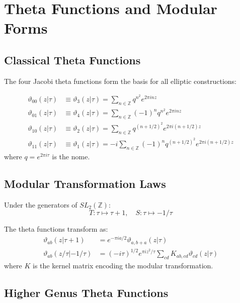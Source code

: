 \appendix
\section{Theta Functions and Modular Forms}

\subsection{Classical Theta Functions}

The four Jacobi theta functions form the basis for all elliptic constructions:

\begin{definition}
\begin{align}
\vartheta_{00}(z|\tau) &\equiv \vartheta_3(z|\tau) = \sum_{n \in \mathbb{Z}} q^{n^2} e^{2\pi inz} \\
\vartheta_{01}(z|\tau) &\equiv \vartheta_4(z|\tau) = \sum_{n \in \mathbb{Z}}(-1)^n q^{n^2} e^{2\pi inz} \\
\vartheta_{10}(z|\tau) &\equiv \vartheta_2(z|\tau) = \sum_{n \in \mathbb{Z}} q^{(n+1/2)^2} e^{2\pi i(n+1/2)z} \\
\vartheta_{11}(z|\tau) &\equiv \vartheta_1(z|\tau) = -i\sum_{n \in \mathbb{Z}}(-1)^n q^{(n+1/2)^2} e^{2\pi i(n+1/2)z}
\end{align}
where $q = e^{2\pi i\tau}$ is the nome.
\end{definition}

\subsection{Modular Transformation Laws}

Under the generators of $SL_2(\mathbb{Z})$:
$$T: \tau \mapsto \tau + 1, \quad S: \tau \mapsto -1/\tau$$

The theta functions transform as:
\begin{align}
\vartheta_{ab}(z|\tau+1) &= e^{-\pi ia/2} \vartheta_{a,b+a}(z|\tau) \\
\vartheta_{ab}(z/\tau|-1/\tau) &= (-i\tau)^{1/2} e^{\pi iz^2/\tau} \sum_{cd} K_{ab,cd} \vartheta_{cd}(z|\tau)
\end{align}
where $K$ is the kernel matrix encoding the modular transformation.

\subsection{Higher Genus Theta Functions}

